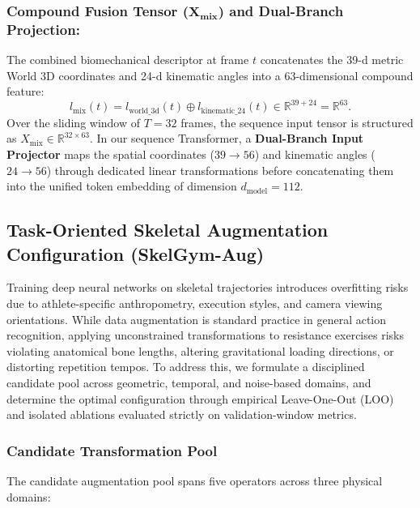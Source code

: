 \documentclass[runningheads]{llncs}
\begin{document}
\subsubsection{Compound Fusion Tensor ($\mathbf{X_{\text{mix}}}$) and Dual-Branch Projection:}
The combined biomechanical descriptor at frame $t$ concatenates the 39-d metric World 3D coordinates and 24-d kinematic angles into a 63-dimensional compound feature:
\begin{equation}
    l_{\text{mix}}(t) = l_{\text{world\_3d}}(t) \oplus l_{\text{kinematic\_24}}(t) \in \mathbb{R}^{39 + 24} = \mathbb{R}^{63}.
\end{equation}
Over the sliding window of $T = 32$ frames, the sequence input tensor is structured as $X_{\text{mix}} \in \mathbb{R}^{32 \times 63}$. In our sequence Transformer, a \textbf{Dual-Branch Input Projector} maps the spatial coordinates ($39 \to 56$) and kinematic angles ($24 \to 56$) through dedicated linear transformations before concatenating them into the unified token embedding of dimension $d_{\text{model}} = 112$.

\subsection{Task-Oriented Skeletal Augmentation Configuration (SkelGym-Aug)}
Training deep neural networks on skeletal trajectories introduces overfitting risks due to athlete-specific anthropometry, execution styles, and camera viewing orientations. While data augmentation is standard practice in general action recognition, applying unconstrained transformations to resistance exercises risks violating anatomical bone lengths, altering gravitational loading directions, or distorting repetition tempos. To address this, we formulate a disciplined candidate pool across geometric, temporal, and noise-based domains, and determine the optimal configuration through empirical Leave-One-Out (LOO) and isolated ablations evaluated strictly on validation-window metrics.

\subsubsection{Candidate Transformation Pool}
The candidate augmentation pool spans five operators across three physical domains:
\end{document}
